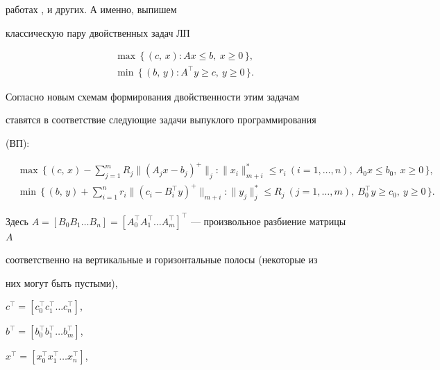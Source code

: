 работах \cite{13}, \cite{14} и других. А именно, выпишем 


классическую пару двойственных задач ЛП


\begin{align}


\label{F5}


&\max\, \{\, (c,\, x): Ax \le b,\ x \ge 0\, \}, \\


%


\label{F6}


&\min\, \{\, (b,\, y): A^{\top} y \ge c,\ y \ge 0\, \}.


\end{align}


Согласно новым схемам формирования двойственности этим задачам


ставятся в соответствие следующие задачи выпуклого программирования


(ВП):


\begin{align}


\label{F7}


&\max\, \bigg\{\, (c,\, x) - \sum^m_{j=1} R_j \|(A_j x-b_j)^+


\|_j : \|x_i\|^*_{m+i}\le r_i\ (i=1,\dotsc,n),\ A_0 x


\le b_0,\ x\ge 0\, \bigg\}, \\


%


\label{F8}


&\min\, \bigg\{\, (b,\, y) + \sum^n_{i=1} r_i \| (c_i -


B_i^{\top} y )^+ \|_{m+i} : \|y_j\|^*_j \le R_j


\ (j=1,\dotsc, m ),\ B_0^{\top} y \ge c_0,\ y\ge 0\, \bigg\}.


\end{align}


Здесь $A = [B_0 B_1\dotsc B_n] = [A_0^{\top} A_1^{\top}


\dotsc A_m^{\top}]^{\top}$ --- произвольное разбиение матрицы $A$


соответственно на вертикальные и горизонтальные полосы (некоторые из


них могут быть пустыми),


$c^{\top} = [ c_0^{\top} c_1^{\top}\dotsc c_n^{\top} ]$,


$b^{\top} = [ b_0^{\top} b_1^{\top}\dotsc b_m^{\top} ]$,


$x^{\top} = [ x_0^{\top} x_1^{\top}\dotsc x_n^{\top} ]$,


